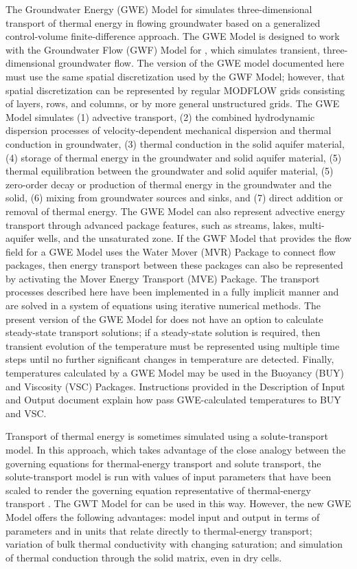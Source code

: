 
The Groundwater Energy (GWE) Model for \mf simulates three-dimensional transport of thermal energy in flowing groundwater based on a generalized control-volume finite-difference approach.  The GWE Model is designed to work with the Groundwater Flow (GWF) Model \citep{modflow6gwf} for \mf, which simulates transient, three-dimensional groundwater flow.  The version of the GWE model documented here must use the same spatial discretization used by the GWF Model; however, that spatial discretization can be represented by regular MODFLOW grids consisting of layers, rows, and columns, or by more general unstructured grids.  The GWE Model simulates (1) advective transport, (2) the combined hydrodynamic dispersion processes of velocity-dependent mechanical dispersion and thermal conduction in groundwater, (3) thermal conduction in the solid aquifer material, (4) storage of thermal energy in the groundwater and solid aquifer material, (5) thermal equilibration between the groundwater and solid aquifer material, (5) zero-order decay or production of thermal energy in the groundwater and the solid, (6) mixing from groundwater sources and sinks, and (7) direct addition or removal of thermal energy.  The GWE Model can also represent advective energy transport through advanced package features, such as streams, lakes, multi-aquifer wells, and the unsaturated zone. If the GWF Model that provides the flow field for a GWE Model uses the Water Mover (MVR) Package to connect flow packages, then energy transport between these packages can also be represented by activating the Mover Energy Transport (MVE) Package. The transport processes described here have been implemented in a fully implicit manner and are solved in a system of equations using iterative numerical methods.  The present version of the GWE Model for \mf does not have an option to calculate steady-state transport solutions; if a steady-state solution is required, then transient evolution of the temperature must be represented using multiple time steps until no further significant changes in temperature are detected.  Finally, temperatures calculated by a GWE Model may be used in the Buoyancy (BUY) and Viscosity (VSC) Packages.  Instructions provided in the \mf Description of Input and Output document explain how pass GWE-calculated temperatures to BUY and VSC.

Transport of thermal energy is sometimes simulated using a solute-transport model. In this approach, which takes advantage of the close analogy between the governing equations for thermal-energy transport and solute transport, the solute-transport model is run with values of input parameters that have been scaled to render the governing equation representative of thermal-energy transport \citep{thorne2006, hechtmendez, mazheng2010}. The GWT Model for \mf can be used in this way. However, the new GWE Model offers the following advantages: model input and output in terms of parameters and in units that relate directly to thermal-energy transport; variation of bulk thermal conductivity with changing saturation; and simulation of thermal conduction through the solid matrix, even in dry cells.

